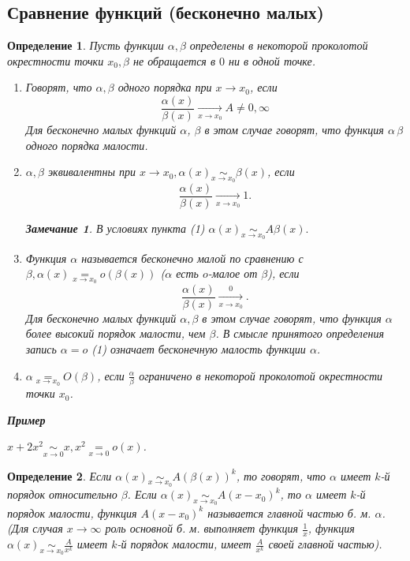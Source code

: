 \documentclass{article}
\newtheorem{Remark}{Замечание}[section]
\newtheorem{Definition}{Определение}[section]
\begin{document}
\subsection{Сравнение функций (бесконечно малых)}
\begin{Definition}
Пусть функции $\alpha, \beta$ определены в некоторой проколотой окрестности точки $x_0, \beta$ не обращается в $0$ ни в одной точке.
\begin{enumerate}
\item Говорят, что $\alpha, \beta$ одного порядка при $x \rightarrow x_0$, если
$$\frac{\alpha(x)}{\beta(x)} \xrightarrow[x \rightarrow x_0]{} A \neq 0, \infty$$
Для бесконечно малых функций $\alpha$, $\beta$ в этом случае говорят, что функция $\alpha\, \beta$ одного порядка малости.
\item $\alpha, \beta$ эквивалентны при $x \rightarrow x_0, \alpha(x) \underset{x \rightarrow x_0}{\sim} \beta(x)$, если
$$\frac{\alpha(x)}{\beta(x)} \xrightarrow[x \rightarrow x_0]{} 1.$$
\begin{Remark} В условиях пункта (1) $\alpha(x) \underset{x \rightarrow x_0}{\sim} A\beta(x).$ \end{Remark}
\item Функция $\alpha$ называется бесконечно малой по сравнению с $\beta, \alpha(x)  \underset{x \rightarrow x_0}{=} o\left(\beta(x) \right)$ ($\alpha$ есть $o$-малое от $\beta$), если
$$\frac{\alpha(x)}{\beta(x)} \xrightarrow[x \rightarrow x_0] 0.$$
Для бесконечно малых функций $\alpha, \beta$ в этом случае говорят, что функция $\alpha$ более высокий порядок малости, чем $\beta$.
В смысле принятого определения запись $\alpha = o$ (1) означает бесконечную малость функции $\alpha$.
\item $\alpha \underset{x \rightarrow x_0}{=} O(\beta)$, если $\frac{\alpha}{\beta}$ ограничено в некоторой проколотой окрестности точки $x_0$.
\end{enumerate}
\par\medskip \textbf{Пример}\par $x + 2x^2 \underset{x \rightarrow 0}{\sim} x, x^2 \underset{x \rightarrow 0}{=} o(x)$.
\end{Definition}

\begin{Definition}
  Если $\alpha(x) \underset{x \rightarrow x_0}{\sim} A \left(\beta(x) \right)^k$, то говорят, что $\alpha$ имеет $k$-й порядок относительно $\beta$.
  Если $\alpha(x) \underset{x \rightarrow x_0}{\sim} A \left(x - x_0 \right)^k$, то $\alpha$ имеет $k$-й порядок малости, функция $A(x-x_0)^k$ называется главной частью б. м. $\alpha$.
  (Для случая $x \rightarrow \infty$ роль основной б. м. выполняет функция $\frac1{x}$, функция $\alpha(x) \underset{x \rightarrow x_0}{\sim} \frac{A}{x^k}$ имеет $k$-й порядок малости, имеет $\frac{A}{x^k}$ своей главной частью).
\end{Definition}
\end{document}
